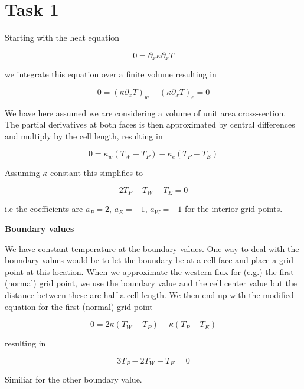 \documentclass{article}
\begin{document}

\section{Task 1}

Starting with the heat equation

\begin{equation}
0 = \partial_x \kappa \partial_x T
\end{equation}

we integrate this equation over a finite volume resulting in

\begin{equation}
\label{eq:fvm_exact}
0 = (\kappa \partial_x T)_w - (\kappa \partial_x T)_e = 0
\end{equation}

We have here assumed we are considering a volume of unit area cross-section. The partial derivatives at both faces is then approximated by central differences and multiply by the cell length, resulting in

\begin{equation}
0 = \kappa_w ( T_W - T_P ) - \kappa_e ( T_P - T_E )
\end{equation}

Assuming $\kappa$ constant this simplifies to

\begin{equation}
2 T_P - T_W - T_E = 0 
\end{equation}

i.e the coefficients are $a_P = 2$, $a_E = -1 $, $a_W = -1 $ for the interior grid points.

\textbf{Boundary values}

We have constant temperature at the boundary values. One way to deal with the boundary values would be to let the boundary be at a cell face and place a grid point at this location. When we approximate the western flux for (e.g.) the first (normal) grid point, we use the boundary value and the cell center value but the distance between these are half a cell length. We then end up with the modified equation for the first (normal) grid point

\begin{equation}
0 = 2\kappa ( T_W - T_P ) - \kappa ( T_P - T_E )
\end{equation}

resulting in

\begin{equation}
3 T_P - 2 T_W - T_E = 0 
\end{equation}

Similiar for the other boundary value.
\end{document}
